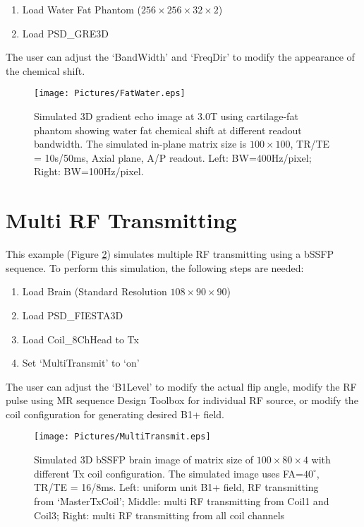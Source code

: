 \documentclass{book}%
\begin{document}
\begin{enumerate}
	\item Load Water Fat Phantom ($256 \times 256 \times 32 \times 2$)
  \item Load PSD\_GRE3D
\end{enumerate}

The user can adjust the `BandWidth' and `FreqDir' to modify the appearance of the chemical shift. 

\begin{figure}[htbp]
	\centering
		\texttt{[image: Pictures/FatWater.eps]}
	\caption{Simulated 3D gradient echo image at 3.0T using cartilage-fat phantom showing water fat chemical shift at different readout bandwidth. The simulated in-plane matrix size is $100 \times 100$, TR/TE = 10s/50ms, Axial plane, A/P readout. Left: BW=400Hz/pixel; Right: BW=100Hz/pixel.}
	\label{fig:FatWater}
\end{figure}

\section{Multi RF Transmitting}

This example (Figure \ref{fig:MultiTransmit}) simulates multiple RF transmitting using a bSSFP sequence. To perform this simulation, the following steps are needed:

\begin{enumerate}
	\item Load Brain (Standard Resolution $108 \times 90 \times 90$)
  \item Load PSD\_FIESTA3D
	\item Load Coil\_8ChHead to Tx
	\item Set `MultiTransmit' to `on'
\end{enumerate}

The user can adjust the `B1Level' to modify the actual flip angle, modify the RF pulse using MR sequence Design Toolbox for individual RF source, or modify the coil configuration for generating desired B1+ field.

\begin{figure}[htbp]
	\centering
		\texttt{[image: Pictures/MultiTransmit.eps]}
	\caption{Simulated 3D bSSFP brain image of matrix size of $100 \times 80 \times 4$ with different Tx coil configuration. The simulated image uses FA=$40^{\circ}$, TR/TE = 16/8ms. Left: uniform unit B1+ field, RF transmitting from `MasterTxCoil'; Middle: multi RF transmitting from Coil1 and Coil3; Right: multi RF transmitting from all coil channels}
	\label{fig:MultiTransmit}
\end{figure}
\end{document}

